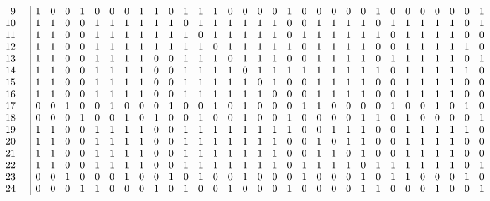 \documentclass{article}
\begin{document}
{{$$\begin{array}{rr|*{31}r}
9 &  & 1 & 0 & 0 & 1 & 0 & 0 & 0 & 1 & 1 & 0 & 1 & 1 & 1 & 0 & 0 & 0 & 0 & 1 & 0 & 0 & 0 & 0 & 0 & 1 & 0 & 0 & 0 & 0 & 0 & 0 & 1\\
10 &  & 1 & 1 & 0 & 0 & 1 & 1 & 1 & 1 & 1 & 1 & 0 & 1 & 1 & 1 & 1 & 1 & 1 & 0 & 0 & 1 & 1 & 1 & 1 & 0 & 1 & 1 & 1 & 1 & 1 & 0 & 1\\
11 &  & 1 & 1 & 0 & 0 & 1 & 1 & 1 & 1 & 1 & 1 & 1 & 0 & 1 & 1 & 1 & 1 & 1 & 0 & 1 & 1 & 1 & 1 & 1 & 1 & 0 & 1 & 1 & 1 & 1 & 0 & 0\\
12 &  & 1 & 1 & 0 & 0 & 1 & 1 & 1 & 1 & 1 & 1 & 1 & 1 & 0 & 1 & 1 & 1 & 1 & 1 & 0 & 1 & 1 & 1 & 1 & 0 & 0 & 1 & 1 & 1 & 1 & 1 & 0\\
13 &  & 1 & 1 & 0 & 0 & 1 & 1 & 1 & 1 & 0 & 0 & 1 & 1 & 1 & 0 & 1 & 1 & 1 & 0 & 0 & 1 & 1 & 1 & 1 & 0 & 1 & 1 & 1 & 1 & 1 & 0 & 1\\
14 &  & 1 & 1 & 0 & 0 & 1 & 1 & 1 & 1 & 0 & 0 & 1 & 1 & 1 & 1 & 0 & 1 & 1 & 1 & 1 & 1 & 1 & 1 & 1 & 1 & 0 & 1 & 1 & 1 & 1 & 1 & 0\\
15 &  & 1 & 1 & 0 & 0 & 1 & 1 & 1 & 1 & 0 & 0 & 1 & 1 & 1 & 1 & 1 & 0 & 1 & 0 & 0 & 1 & 1 & 1 & 1 & 0 & 0 & 1 & 1 & 1 & 1 & 0 & 0\\
16 &  & 1 & 1 & 0 & 0 & 1 & 1 & 1 & 1 & 0 & 0 & 1 & 1 & 1 & 1 & 1 & 1 & 0 & 0 & 0 & 1 & 1 & 1 & 1 & 0 & 0 & 1 & 1 & 1 & 1 & 0 & 0\\
17 &  & 0 & 0 & 1 & 0 & 0 & 1 & 0 & 0 & 0 & 1 & 0 & 0 & 1 & 0 & 1 & 0 & 0 & 0 & 1 & 1 & 0 & 0 & 0 & 0 & 1 & 0 & 0 & 1 & 0 & 1 & 0\\
18 &  & 0 & 0 & 0 & 1 & 0 & 0 & 1 & 0 & 1 & 0 & 0 & 1 & 0 & 0 & 1 & 0 & 0 & 1 & 0 & 0 & 0 & 0 & 1 & 1 & 0 & 1 & 0 & 0 & 0 & 0 & 1\\
19 &  & 1 & 1 & 0 & 0 & 1 & 1 & 1 & 1 & 0 & 0 & 1 & 1 & 1 & 1 & 1 & 1 & 1 & 1 & 0 & 0 & 1 & 1 & 1 & 0 & 0 & 1 & 1 & 1 & 1 & 1 & 0\\
20 &  & 1 & 1 & 0 & 0 & 1 & 1 & 1 & 1 & 0 & 0 & 1 & 1 & 1 & 1 & 1 & 1 & 1 & 0 & 0 & 1 & 0 & 1 & 1 & 0 & 0 & 1 & 1 & 1 & 1 & 0 & 0\\
21 &  & 1 & 1 & 0 & 0 & 1 & 1 & 1 & 1 & 0 & 0 & 1 & 1 & 1 & 1 & 1 & 1 & 1 & 0 & 0 & 1 & 1 & 0 & 1 & 0 & 0 & 1 & 1 & 1 & 1 & 0 & 0\\
22 &  & 1 & 1 & 0 & 0 & 1 & 1 & 1 & 1 & 0 & 0 & 1 & 1 & 1 & 1 & 1 & 1 & 1 & 0 & 1 & 1 & 1 & 1 & 0 & 1 & 1 & 1 & 1 & 1 & 1 & 0 & 1\\
23 &  & 0 & 0 & 1 & 0 & 0 & 0 & 1 & 0 & 0 & 1 & 0 & 1 & 0 & 0 & 1 & 0 & 0 & 0 & 1 & 0 & 0 & 0 & 1 & 0 & 1 & 1 & 0 & 0 & 0 & 1 & 0\\
24 &  & 0 & 0 & 0 & 1 & 1 & 0 & 0 & 0 & 1 & 0 & 1 & 0 & 0 & 1 & 0 & 0 & 0 & 1 & 0 & 0 & 0 & 0 & 1 & 1 & 0 & 0 & 0 & 1 & 0 & 0 & 1\\

\end{array}$$}}
\end{document}
